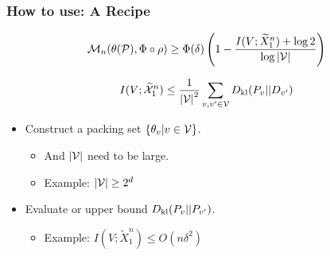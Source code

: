 \documentclass[10pt,xcolor={usenames,dvipsnames,table},aspectratio=169]{beamer}
\begin{document}
\begin{frame}
    \frametitle{How to use: A Recipe}
    \begin{equation}
    \label{eq:11}
    \mathcal{M}_n(\theta(\mathcal{P}), \Phi \circ \rho) \geq \Phi(\delta) \left( 1 - \dfrac{I(V; \widetilde{X}_1^{n}) + \log 2}{\log \left\lvert\mathcal{V}\right\rvert} \right) 
    \end{equation}

    \begin{equation}
\label{eq:22}
    I(V; \widetilde{\mathcal{X}}_1^{n}) \leq \dfrac{1}{\left\lvert\mathcal{V}\right\rvert^2} \sum_{v, v' \in \mathcal{V}} D_{\rm kl}(P_v || D_{v'}) 
    \end{equation}

    \begin{itemize} 
        \item Construct a packing set $\left\{\theta_v| v\in \mathcal{V}\right\}$. 
            \begin{itemize}
                \item And $\left\lvert\mathcal{V}\right\rvert$ need to be large.
                \item Example: $\left\lvert\mathcal{V}\right\rvert \geq 2^{d}$
            \end{itemize}

        \item Evaluate or upper bound $D_{\rm kl} (P_v || P_{v'})$.
            \begin{itemize}
                \item Example: $I(V; \widetilde{X}_1^{n}) \leq O(n \delta^2)$
            \end{itemize}
    \end{itemize}
\end{frame}
\end{document}
